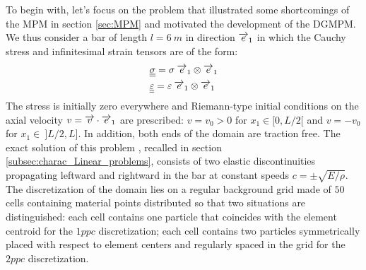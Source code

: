 To begin with, let's focus on the problem that illustrated some shortcomings of the MPM in section \ref{sec:MPM} and motivated the development of the DGMPM.
We thus consider a bar of length $l=6\:m$ in direction ${\overrightarrow{e}}_1$ in which the Cauchy stress and infinitesimal strain tensors are of the form:
\begin{align*}
  & {\underline{\underline{\sigma}}} = \sigma \: {\overrightarrow{e}}_1\otimes {\overrightarrow{e}}_1 \\
  & {\underline{\underline{\varepsilon}}} = \varepsilon \: {\overrightarrow{e}}_1\otimes {\overrightarrow{e}}_1
\end{align*}
The stress is initially zero everywhere and Riemann-type initial conditions on the axial velocity $v={\overrightarrow{v}}\cdot{\overrightarrow{e}}_1$ are prescribed: $v=v_0>0$ for $x_1\in [0,L/2[$ and $v=-v_0$ for $x_1\in \:]L/2,L]$. In addition, both ends of the domain are traction free.
The exact solution of this problem \cite[Ch.1]{Wang}, recalled in section \ref{subsec:charac_Linear_problems}, consists of two elastic discontinuities propagating leftward and rightward in the bar at constant speeds $c=\pm\sqrt{E/\rho}$. 
The discretization of the domain lies on a regular background grid made of $50$ cells containing material points distributed so that two situations are distinguished: each cell contains one particle that coincides with the element centroid for the $1ppc$ discretization; each cell contains two particles symmetrically placed with respect to element centers and regularly spaced in the grid for the $2ppc$ discretization.

